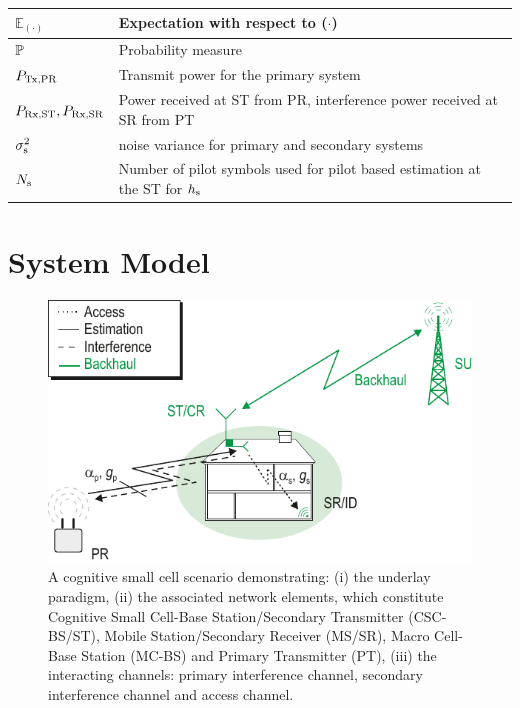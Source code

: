 \begin{table}
{\begin{tabular}{p{}||p{}}
$\mathbb E_{(\cdot)}$ & Expectation with respect to ($\cdot$) \\ \hline
$\mathbb P$ & Probability measure \\ \hline
$P_{\text{Tx,PR}}$ & Transmit power for the primary system\\ \hline
$P_{\text{Rx,ST}}, P_{\text{Rx,SR}}$ & Power received at ST from PR, interference power received at SR from PT\\ \hline
$\sigma^2_{\text{s}}$ & noise variance for primary and secondary systems\\ \hline
$N_{\text{s}}$ & Number of pilot symbols used for pilot based estimation at the ST for $h_{\text{s}}$ \\ \hline
\end{tabular}
}
\end{table}

\section{System Model} \label{sec:sys_mod}
\begin{figure}[!t]
\centering
\includegraphics[width = \figscalet]{figures/CR_Scenario_Underlay}
\caption{A cognitive small cell scenario demonstrating: (i) the underlay paradigm, (ii) the associated network elements, which constitute Cognitive Small Cell-Base Station/Secondary Transmitter (CSC-BS/ST), Mobile Station/Secondary Receiver (MS/SR), Macro Cell-Base Station (MC-BS) and Primary Transmitter (PT), (iii) the interacting channels: primary interference channel, secondary interference channel and access channel.}
\label{fig:scenario}
\end{figure}

